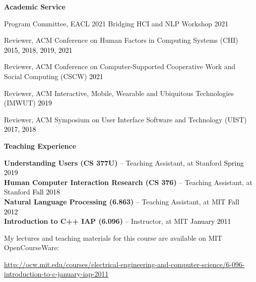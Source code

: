 \documentclass[10pt,A4]{article}
\newcommand{\cvsection}[1]
{
	\begin{center}
		\large\textcolor{sectcol}{\textbf{#1}}
	\end{center}
}
\begin{document}
\cvsection{Academic Service}

Program Committee, EACL 2021 Bridging HCI and NLP Workshop \hfill 2021

Reviewer, ACM Conference on Human Factors in Computing Systems (CHI) \hfill \textcolor{black}{2015, 2018, 2019, 2021}

Reviewer, ACM Conference on Computer-Supported Cooperative Work and Social Computing (CSCW) \hfill \textcolor{black}{2021}

Reviewer, ACM Interactive, Mobile, Wearable and Ubiquitous Technologies (IMWUT) \hfill \textcolor{black}{2019}

Reviewer, ACM Symposium on User Interface Software and Technology (UIST) \hfill \textcolor{black}{2017, 2018}\\



\cvsection{Teaching Experience}

\textbf{Understanding Users (CS 377U)} -- Teaching Assistant, at Stanford \hfill \textcolor{black}{Spring 2019} \\

\textbf{Human Computer Interaction Research (CS 376)} -- Teaching Assistant, at Stanford \hfill \textcolor{black}{Fall 2018} \\

\textbf{Natural Language Processing (6.863)} -- Teaching Assistant, at MIT \hfill \textcolor{black}{Fall 2012} \\

\textbf{Introduction to C++ IAP (6.096)} -- Instructor, at MIT \hfill \textcolor{black}{January 2011}

My lectures and teaching materials for this course are available on MIT OpenCourseWare:

\begin{footnotesize}
\url{http://ocw.mit.edu/courses/electrical-engineering-and-computer-science/6-096-introduction-to-c-january-iap-2011}
\end{footnotesize}\\
\end{document}

